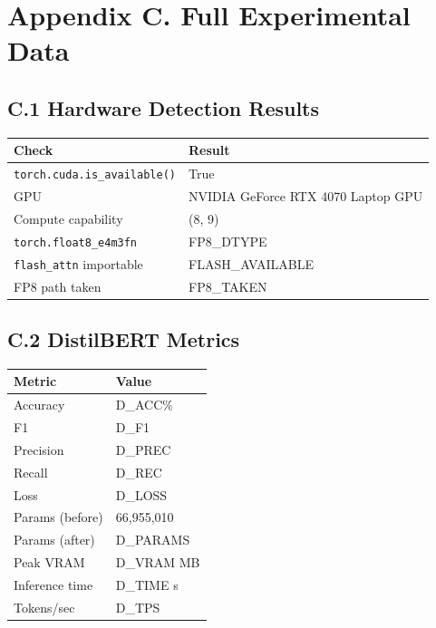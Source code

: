 
\section{Appendix C. Full Experimental Data}

\subsection{C.1 Hardware Detection Results}

\begin{table}[H]
\centering
\small
\begin{tabular}{ll}
\toprule
\textbf{Check} & \textbf{Result} \\
\midrule
\texttt{torch.cuda.is\_available()} & True \\
GPU & NVIDIA GeForce RTX 4070 Laptop GPU \\
Compute capability & (8, 9) \\
\texttt{torch.float8\_e4m3fn} & {{FP8\_DTYPE}} \\
\texttt{flash\_attn} importable & {{FLASH\_AVAILABLE}} \\
FP8 path taken & {{FP8\_TAKEN}} \\
\bottomrule
\end{tabular}
\end{table}

\subsection{C.2 DistilBERT Metrics}

\begin{table}[H]
\centering
\small
\begin{tabular}{ll}
\toprule
\textbf{Metric} & \textbf{Value} \\
\midrule
Accuracy & {{D\_ACC}}\% \\
F1 & {{D\_F1}} \\
Precision & {{D\_PREC}} \\
Recall & {{D\_REC}} \\
Loss & {{D\_LOSS}} \\
Params (before) & 66,955,010 \\
Params (after) & {{D\_PARAMS}} \\
Peak VRAM & {{D\_VRAM}} MB \\
Inference time & {{D\_TIME}} s \\
Tokens/sec & {{D\_TPS}} \\
\bottomrule
\end{tabular}
\end{table}

